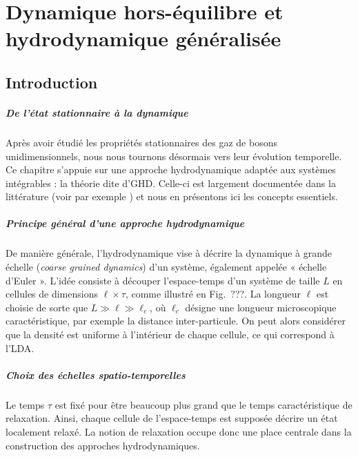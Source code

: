 \chapter{Dynamique hors-équilibre et hydrodynamique généralisée}
\label{chap:GHD}
\minitoc


\section*{Introduction}


\paragraph{De l’état stationnaire à la dynamique}  
Après avoir étudié les propriétés stationnaires des gaz de bosons unidimensionnels, nous nous tournons désormais vers leur évolution temporelle. Ce chapitre s’appuie sur une approche hydrodynamique adaptée aux systèmes intégrables : la théorie dite d’\gls{GHD}. Celle-ci est largement documentée dans la littérature (voir par exemple \cite{Doyon_GHD_2020,Bouchoule_2022,ESSLER2023127572,kerr2023theory}) et nous en présentons ici les concepts essentiels.

\paragraph{Principe général d’une approche hydrodynamique}  
De manière générale, l’hydrodynamique vise à décrire la dynamique à grande échelle (\emph{coarse grained dynamics}) d’un système, également appelée « échelle d’Euler ». L’idée consiste à découper l’espace-temps d’un système de taille $L$ en cellules de dimensions $\ell \times \tau$, comme illustré en Fig.~???.  
La longueur $\ell$ est choisie de sorte que $L \gg \ell \gg \ell_c$, où $\ell_c$ désigne une longueur microscopique caractéristique, par exemple la distance inter-particule. On peut alors considérer que la densité est uniforme à l’intérieur de chaque cellule, ce qui correspond à l’\gls{LDA}.

\paragraph{Choix des échelles spatio-temporelles}  
Le temps $\tau$ est fixé pour être beaucoup plus grand que le temps caractéristique de relaxation. Ainsi, chaque cellule de l’espace-temps est supposée décrire un état localement relaxé. La notion de relaxation occupe donc une place centrale dans la construction des approches hydrodynamiques.

